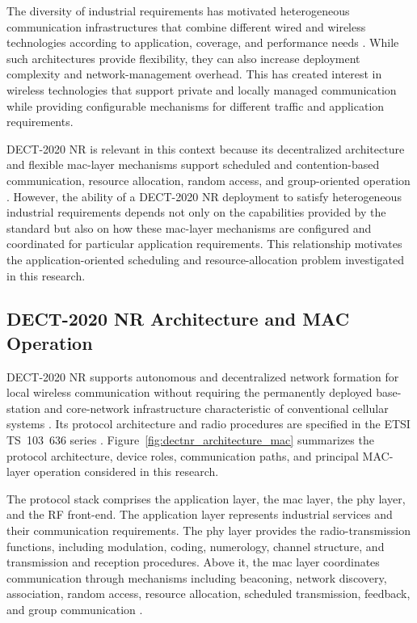 \documentclass[12pt,a4paper]{article}
\begin{document}
The diversity of industrial requirements has motivated heterogeneous communication infrastructures that combine different wired and wireless technologies according to application, coverage, and performance needs \cite{alizaiHeterogeneousCommunicationNetworks2023a,karrenbauerFutureIndustrialNetworking2019a,aschenbrennerFlexiCell5GLocationbased2022a}. While such architectures provide flexibility, they can also increase deployment complexity and network-management overhead. This has created interest in wireless technologies that support private and locally managed communication while providing configurable mechanisms for different traffic and application requirements.

DECT-2020 NR is relevant in this context because its decentralized architecture and flexible \gls{mac}-layer mechanisms support scheduled and contention-based communication, resource allocation, random access, and group-oriented operation \cite{etsi_ts103636_1,etsi_ts103636_4,perez-guiraoDECTNRUnveiling2022,kovalchukovDECT2020NewRadio2022}. However, the ability of a DECT-2020 NR deployment to satisfy heterogeneous industrial requirements depends not only on the capabilities provided by the standard but also on how these \gls{mac}-layer mechanisms are configured and coordinated for particular application requirements. This relationship motivates the application-oriented scheduling and resource-allocation problem investigated in this research.

\subsection{DECT-2020 NR Architecture and MAC Operation}
\label{subsec:dect-architecture-mac}

DECT-2020 NR supports autonomous and decentralized network formation for local wireless communication without requiring the permanently deployed base-station and core-network infrastructure characteristic of conventional cellular systems \cite{kovalchukovDECT2020NewRadio2022,dhanwaniAssessmentCandidateTechnology2020}. Its protocol architecture and radio procedures are specified in the ETSI TS~103~636 series \cite{etsi_ts103636_1,etsi_ts103636_2,etsi_ts103636_3,etsi_ts103636_4}. Figure~\ref{fig:dectnr_architecture_mac} summarizes the protocol architecture, device roles, communication paths, and principal MAC-layer operation considered in this research.

The protocol stack comprises the application layer, the \gls{mac} layer, the \gls{phy} layer, and the RF front-end. The application layer represents industrial services and their communication requirements. The \gls{phy} layer provides the radio-transmission functions, including modulation, coding, numerology, channel structure, and transmission and reception procedures. Above it, the \gls{mac} layer coordinates communication through mechanisms including beaconing, network discovery, association, random access, resource allocation, scheduled transmission, feedback, and group communication \cite{etsi_ts103636_2,etsi_ts103636_3,etsi_ts103636_4}.
\end{document}
